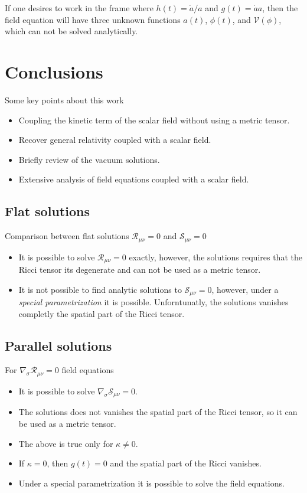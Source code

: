 \documentclass[10pt,a4paper]{article}
\begin{document}
If one desires to work in the frame where $h(t) = \dot{a}/a$ and $g(t) = \dot{a}a$, then the field equation will have three unknown
functions $a(t)$, $\phi(t)$, and $\mathcal{V}(\phi)$, which can not be solved analytically.

\section{Conclusions}

Some key points about this work

\begin{itemize}
  \item Coupling the kinetic term of the scalar field without using a metric tensor.
  \item Recover general relativity coupled with a scalar field.
  \item Briefly review of the vacuum solutions.
  \item Extensive analysis of field equations coupled with a scalar field.
\end{itemize}

\subsection{Flat solutions}

Comparison between flat solutions $\mathcal{R}_{\mu\nu} = 0$ and $\mathcal{S}_{\mu\nu} = 0$

\begin{itemize}
  \item It is possible to solve $\mathcal{R}_{\mu\nu} = 0$ exactly, however, the solutions requires that the Ricci tensor its degenerate and can not be used as a metric tensor.
  \item It is not possible to find analytic solutions to $\mathcal{S}_{\mu\nu} = 0$, however, under a \textit{special parametrization} it is possible. Unforntunatly, the solutions
        vanishes completly the spatial part of the Ricci tensor.
\end{itemize}

\subsection{Parallel solutions}

For $\nabla_\sigma \mathcal{R}_{\mu\nu} = 0$ field equations
\begin{itemize}
  \item It is possible to solve $\nabla_\sigma \mathcal{S}_{\mu\nu} = 0$.
  \item The solutions does not vanishes the spatial part of the Ricci tensor, so it can be used as a metric tensor.
  \item The above is true only for $\kappa \neq 0$.
  \item If $\kappa = 0$, then $g(t) = 0$ and the spatial part of the Ricci vanishes.
  \item Under a special parametrization it is possible to solve the field equations.
\end{itemize}
\end{document}
